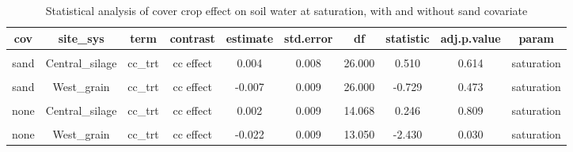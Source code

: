 \documentclass[
]{article}
\begin{document}
\begin{table}[H]

\caption{\label{tab:sat}Statistical analysis of cover crop effect on soil water at saturation, with and without sand covariate}
\centering
\begin{tabular}[t]{cccccccccc}
\toprule
cov & site\_sys & term & contrast & estimate & std.error & df & statistic & adj.p.value & param\\
\midrule
\cellcolor{gray!6}{sand} & \cellcolor{gray!6}{Central\_grain} & \cellcolor{gray!6}{cc\_trt} & \cellcolor{gray!6}{cc effect} & \cellcolor{gray!6}{-0.013} & \cellcolor{gray!6}{0.008} & \cellcolor{gray!6}{26.000} & \cellcolor{gray!6}{-1.688} & \cellcolor{gray!6}{0.103} & \cellcolor{gray!6}{saturation}\\
\cmidrule{1-10}
sand & Central\_silage & cc\_trt & cc effect & 0.004 & 0.008 & 26.000 & 0.510 & 0.614 & saturation\\
\cmidrule{1-10}
\cellcolor{gray!6}{sand} & \cellcolor{gray!6}{East\_grain} & \cellcolor{gray!6}{cc\_trt} & \cellcolor{gray!6}{cc effect} & \cellcolor{gray!6}{0.011} & \cellcolor{gray!6}{0.009} & \cellcolor{gray!6}{26.000} & \cellcolor{gray!6}{1.271} & \cellcolor{gray!6}{0.215} & \cellcolor{gray!6}{saturation}\\
\cmidrule{1-10}
sand & West\_grain & cc\_trt & cc effect & -0.007 & 0.009 & 26.000 & -0.729 & 0.473 & saturation\\
\cmidrule{1-10}
\cellcolor{gray!6}{none} & \cellcolor{gray!6}{Central\_grain} & \cellcolor{gray!6}{cc\_trt} & \cellcolor{gray!6}{cc effect} & \cellcolor{gray!6}{-0.016} & \cellcolor{gray!6}{0.008} & \cellcolor{gray!6}{13.050} & \cellcolor{gray!6}{-1.959} & \cellcolor{gray!6}{0.072} & \cellcolor{gray!6}{saturation}\\
\cmidrule{1-10}
none & Central\_silage & cc\_trt & cc effect & 0.002 & 0.009 & 14.068 & 0.246 & 0.809 & saturation\\
\cmidrule{1-10}
\cellcolor{gray!6}{none} & \cellcolor{gray!6}{East\_grain} & \cellcolor{gray!6}{cc\_trt} & \cellcolor{gray!6}{cc effect} & \cellcolor{gray!6}{0.002} & \cellcolor{gray!6}{0.009} & \cellcolor{gray!6}{13.050} & \cellcolor{gray!6}{0.228} & \cellcolor{gray!6}{0.823} & \cellcolor{gray!6}{saturation}\\
\cmidrule{1-10}
none & West\_grain & cc\_trt & cc effect & -0.022 & 0.009 & 13.050 & -2.430 & 0.030 & saturation\\
\bottomrule
\end{tabular}
\end{table}
\end{document}
